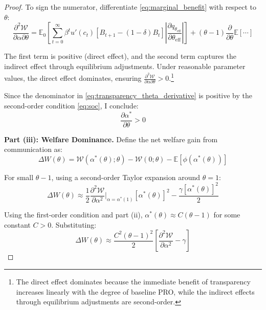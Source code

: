 \documentclass[12pt]{article}
\theoremstyle{plain}
\begin{document}
\begin{proof}
	To sign the numerator, differentiate \eqref{eq:marginal_benefit} with respect
	to $\theta$:
	\begin{equation}
		\frac{\partial^2 \mathcal{W}}{\partial \alpha \partial \theta} = \mathbb{E}_0 \left[ \sum_{t=0}^\infty \beta^t u'(c_t) [B_{t+1} - (1-\delta)B_t] \left|\frac{\partial q_{\theta_{\text{eff}}}}{\partial \theta_{\text{eff}}}\right| \right] + (\theta-1) \frac{\partial}{\partial \theta} \mathbb{E}[\cdots] \label{eq:cross_derivative}
	\end{equation}

	The first term is positive (direct effect), and the second term captures the
	indirect effect through equilibrium adjustments. Under reasonable parameter
	values, the direct effect dominates, ensuring $\frac{\partial^2
			\mathcal{W}}{\partial \alpha \partial \theta} > 0$.\footnote{The direct effect
		dominates because the immediate benefit of transparency increases linearly with
		the degree of baseline PRO, while the indirect effects through equilibrium
		adjustments are second-order.}

	Since the denominator in \eqref{eq:transparency_theta_derivative} is positive
	by the second-order condition \eqref{eq:soc}, I conclude:
	\begin{equation}
		\frac{\partial
			\alpha^*}{\partial \theta} > 0 \label{eq:transparency_increasing}
	\end{equation}

	\textbf{Part (iii): Welfare Dominance.}
	Define the net welfare gain from communication as:
	\begin{equation}
		\Delta W(\theta) = \mathcal{W}(\alpha^*(\theta); \theta) - \mathcal{W}(0; \theta) - \mathbb{E}[\phi(\alpha^*(\theta))] \label{eq:welfare_gain}
	\end{equation}

	For small $\theta-1$, using a second-order Taylor expansion around $\theta =
		1$:
	\begin{equation}
		\Delta W(\theta) \approx \frac{1}{2} \frac{\partial^2 \mathcal{W}}{\partial \alpha^2}\bigg|_{\alpha=\alpha^*(1)} [\alpha^*(\theta)]^2 - \frac{\gamma [\alpha^*(\theta)]^2}{2} \label{eq:welfare_expansion}
	\end{equation}

	Using the first-order condition and part (ii), $\alpha^*(\theta) \approx
		C(\theta-1)$ for some constant $C > 0$. Substituting:
	\begin{equation}
		\Delta W(\theta) \approx \frac{C^2(\theta-1)^2}{2} \left[ \frac{\partial^2 \mathcal{W}}{\partial \alpha^2} - \gamma \right] \label{eq:welfare_approximation}
	\end{equation}


\end{proof}
\end{document}

